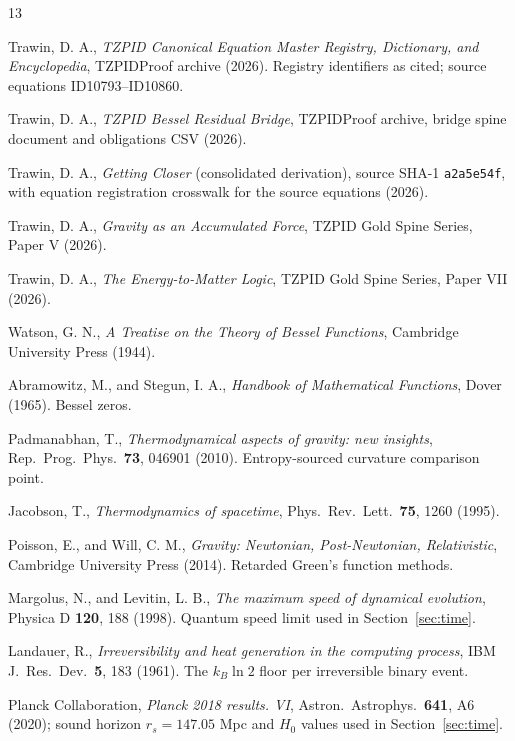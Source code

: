 \documentclass[11pt]{article}
\theoremstyle{remark}
\begin{document}
\begin{thebibliography}{13}

 Trawin, D. A., \emph{TZPID Canonical Equation Master Registry, Dictionary, and Encyclopedia}, TZPIDProof archive (2026). Registry identifiers as cited; source equations ID10793--ID10860.

 Trawin, D. A., \emph{TZPID Bessel Residual Bridge}, TZPIDProof archive, bridge spine document and obligations CSV (2026).

 Trawin, D. A., \emph{Getting Closer} (consolidated derivation), source SHA-1 \texttt{a2a5e54f}, with equation registration crosswalk for the source equations (2026).

 Trawin, D. A., \emph{Gravity as an Accumulated Force}, TZPID Gold Spine Series, Paper V (2026).

 Trawin, D. A., \emph{The Energy-to-Matter Logic}, TZPID Gold Spine Series, Paper VII (2026).

 Watson, G. N., \emph{A Treatise on the Theory of Bessel Functions}, Cambridge University Press (1944).

 Abramowitz, M., and Stegun, I. A., \emph{Handbook of Mathematical Functions}, Dover (1965). Bessel zeros.

 Padmanabhan, T., \emph{Thermodynamical aspects of gravity: new insights}, Rep.\ Prog.\ Phys.\ \textbf{73}, 046901 (2010). Entropy-sourced curvature comparison point.

 Jacobson, T., \emph{Thermodynamics of spacetime}, Phys.\ Rev.\ Lett.\ \textbf{75}, 1260 (1995).

 Poisson, E., and Will, C. M., \emph{Gravity: Newtonian, Post-Newtonian, Relativistic}, Cambridge University Press (2014). Retarded Green's function methods.

 Margolus, N., and Levitin, L. B., \emph{The maximum speed of dynamical evolution}, Physica D \textbf{120}, 188 (1998). Quantum speed limit used in Section~\ref{sec:time}.

 Landauer, R., \emph{Irreversibility and heat generation in the computing process}, IBM J.\ Res.\ Dev.\ \textbf{5}, 183 (1961). The $k_B \ln 2$ floor per irreversible binary event.

 Planck Collaboration, \emph{Planck 2018 results. VI}, Astron.\ Astrophys.\ \textbf{641}, A6 (2020); sound horizon $r_s = 147.05$ Mpc and $H_0$ values used in Section~\ref{sec:time}.

\end{thebibliography}
\end{document}
